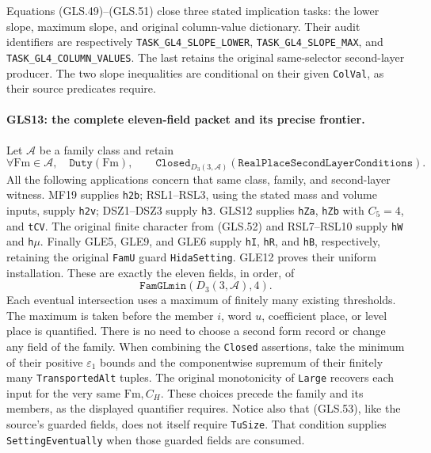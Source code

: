 Equations (GLS.49)--(GLS.51) close three stated implication tasks:
the lower slope, maximum slope, and original column-value dictionary.
Their audit identifiers are respectively
\texttt{TASK\_GL4\_SLOPE\_LOWER},
\texttt{TASK\_GL4\_SLOPE\_MAX}, and
\texttt{TASK\_GL4\_COLUMN\_VALUES}.
The last retains the original same-selector second-layer producer.
The two slope inequalities are conditional on their given
\texttt{ColVal}, as their source predicates require.

\paragraph{GLS13: the complete eleven-field packet and its precise frontier.}
\label{claim:GLS13}
Let $\mathcal A$ be a family class and retain
\[
 \forall\mathrm{Fm}\in\mathcal A,\quad\texttt{Duty}(\mathrm{Fm}),
 \qquad
 \texttt{Closed}_{D_3(3,\mathcal A)}
                   (\texttt{RealPlaceSecondLayerConditions}).
 \tag{GLS.52}
\]
All the following applications concern that same class, family,
and second-layer witness.  MF19 supplies \texttt{h2b};
RSL1--RSL3, using the stated mass and volume inputs, supply
\texttt{h2v}; DSZ1--DSZ3 supply \texttt{h3}.
GLS12 supplies \texttt{hZa}, \texttt{hZb} with $C_5=4$, and
\texttt{tCV}.  The original finite character from (GLS.52) and
RSL7--RSL10 supply \texttt{hW} and \texttt{h}$\mu$.
Finally GLE5, GLE9, and GLE6 supply \texttt{hI}, \texttt{hR}, and
\texttt{hB}, respectively, retaining the original \texttt{FamU}
guard \texttt{HidaSetting}.  GLE12 proves their uniform installation.
These are exactly the eleven fields, in order, of
\[
                    \texttt{FamGLmin}(D_3(3,\mathcal A),4).
 \tag{GLS.53}
\]
Each eventual intersection uses a maximum of finitely many existing
thresholds.  The maximum is taken before the member $i$, word $u$,
coefficient place, or level place is quantified.  There is no need
to choose a second form record or change any field of the family.
When combining the \texttt{Closed} assertions, take the minimum
of their positive $\varepsilon_1$ bounds and the componentwise
supremum of their finitely many \texttt{TransportedAlt} tuples.
The original monotonicity of \texttt{Large} recovers each input
for the very same $\mathrm{Fm},C_H$.  These choices precede the
family and its members, as the displayed quantifier requires.
Notice also that (GLS.53), like the source's guarded fields, does
not itself require \texttt{TuSize}.  That condition supplies
\texttt{SettingEventually} when those guarded fields are consumed.

